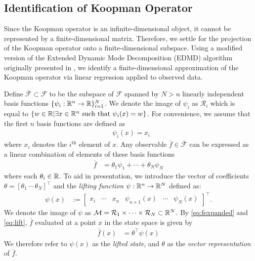 \subsection{Identification of Koopman Operator}
\label{sec:koopid}

Since the Koopman operator is an infinite-dimensional object, it cannot be represented by a finite-dimensional matrix. 
Therefore, we settle for the projection of the Koopman operator onto a finite-dimensional subspace.
Using a modified version of the Extended Dynamic Mode Decomposition (EDMD) algorithm \cite{williams2015data} originally presented in \cite{mauroy2016linear,mauroy2017koopman}, we identify a finite-dimensional approximation of the Koopman operator via linear regression applied to observed data.

Define ${\bar{\mathcal{F}} \subset \mathcal{F}}$ to be the subspace of $\mathcal{F}$ spanned by ${N>n}$ linearly independent basis functions 
${ \{ \psi_i : \mathbb{R}^n \to \mathbb{R} \}_{i=1}^N}$.
We denote the image of $\psi_i$ as $ \mathcal{R}_i$ which is equal to ${ \{ w \in \mathbb{R} | \exists x \in \mathbb{R}^n \text{ such that } \psi_i(x) = w  \} }$.
For convenience, we assume that the first $n$ basis functions are defined as
\begin{align}
    &\psi_i(x) = x_i
    \label{eq:xinpsi}
\end{align}
where $x_i$ denotes the $i^{\text{th}}$ element of $x$.
Any observable $\bar{f} \in \bar{\mathcal{F}}$ can be expressed as a linear combination of elements of these basis functions
\begin{align}
    \bar{f} &= \theta_1 \psi_1 + \cdots + \theta_N \psi_N
    \label{eq:fexpanded}
\end{align}
where each $\theta_i \in \mathbb{R}$.
To aid in presentation, we introduce the vector of coefficients ${\theta = [ \theta_1 \,  \cdots \, \theta_N ]^\top}$ and the \emph{lifting function} ${\psi : \mathbb{R}^n \to \mathbb{R}^N}$ defined as:
\begin{align}
    \psi(x) &:= \begin{bmatrix} x_i & \cdots & x_n & \psi_{n+1} (x) & \cdots & \psi_N (x) \end{bmatrix}^\top.
    \label{eq:lift}
\end{align}
We denote the image of $\psi$ as $\mathcal{M} = \mathcal{R}_1 \times \cdots \times \mathcal{R}_N \subset \mathbb{R}^N$.
By \eqref{eq:fexpanded} and \eqref{eq:lift}, $\bar{f}$ evaluated at a point $x$ in the state space is given by
\begin{align}
    \bar{f}(x) &= \theta^\top \psi (x)
    \label{eq:fvec}
\end{align}
We therefore refer to $\psi(x)$ as the \emph{lifted state}, and $\theta$ as the \emph{vector representation} of $\bar{f}$.

